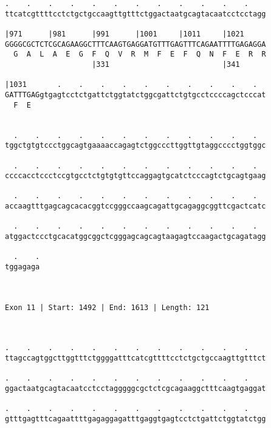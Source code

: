 \documentclass{article}
\begin{document}
\begin{Verbatim}
.    .    .    .    .    .    .    .    .    .    .    .    
ttcatcgttttcctctgctgccaagttgtttctggactaatgcagtacaatcctcctagg
                                                            
|971      |981      |991      |1001     |1011     |1021     
GGGGCGCTCTCGCAGAAGGCTTTCAAGTGAGGATGTTTGAGTTTCAGAATTTTGAGAGGA
  G  A  L  A  E  G  F  Q  V  R  M  F  E  F  Q  N  F  E  R  R
                    |331                          |341      
  
|1031       .    .    .    .    .    .    .    .    .    .  
GATTTGAGgtgagtcctctgattctggtatctggcgattctgtgcctccccagctcccat
  F  E                                                      
                                                            
  
  .    .    .    .    .    .    .    .    .    .    .    .  
tggctgtgtccctggcagtgaaaaccagagtctggcccttggttgtaggcccctggtggc
                                                            
  .    .    .    .    .    .    .    .    .    .    .    .  
ccccacctccctccgtgcctctgtgtgttccaggagtgcatctcccagtctgcagtgaag
                                                            
  .    .    .    .    .    .    .    .    .    .    .    .  
accaagtttgagcagcacacggtccgggccaagcagattgcagaggcggttcgactcatc
                                                            
  .    .    .    .    .    .    .    .    .    .    .    .  
atggactccctgcacatggcggctcgggagcagcagtaagagtccaagactgcagatagg
                                                            
  .    .
tggagaga
        
        
 
Exon 11 | Start: 1492 | End: 1613 | Length: 121



.    .    .    .    .    .    .    .    .    .    .    .    
ttagccagtggcttggtttctggggatttcatcgttttcctctgctgccaagttgtttct
                                                            
.    .    .    .    .    .    .    .    .    .    .    .    
ggactaatgcagtacaatcctcctagggggcgctctcgcagaaggctttcaagtgaggat
                                                            
.    .    .    .    .    .    .    .    .    .    .    .    
gtttgagtttcagaattttgagaggagatttgaggtgagtcctctgattctggtatctgg
                                                            

\end{Verbatim}
\end{document}
